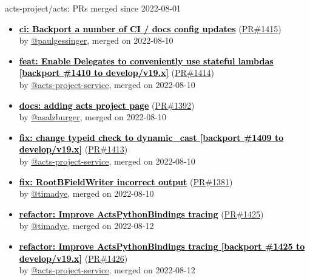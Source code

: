 \documentclass{beamer}
\begin{document}
\begin{frame}[allowframebreaks]{ acts-project/acts: PRs merged since 2022-08-01 }
\begin{itemize}
    \item
    \textbf{\href{https://github.com/acts-project/acts/pull/1415}{\textcolor{black}{ci: Backport a number of CI / docs config updates}}}
    (\href{https://github.com/acts-project/acts/pull/1415}{PR\#1415}) \\
    by \href{https://github.com/paulgessinger}{ @paulgessinger}, merged on 2022-08-10

    \item
    \textbf{\href{https://github.com/acts-project/acts/pull/1414}{\textcolor{black}{feat: Enable Delegates to conveniently use stateful lambdas [backport \#1410 to develop/v19.x]}}}
    (\href{https://github.com/acts-project/acts/pull/1414}{PR\#1414}) \\
    by \href{https://github.com/acts-project-service}{ @acts-project-service}, merged on 2022-08-10

    \item
    \textbf{\href{https://github.com/acts-project/acts/pull/1392}{\textcolor{black}{docs: adding acts project page}}}
    (\href{https://github.com/acts-project/acts/pull/1392}{PR\#1392}) \\
    by \href{https://github.com/asalzburger}{ @asalzburger}, merged on 2022-08-10

    \item
    \textbf{\href{https://github.com/acts-project/acts/pull/1413}{\textcolor{black}{fix: change typeid check to dynamic\_cast [backport \#1409 to develop/v19.x]}}}
    (\href{https://github.com/acts-project/acts/pull/1413}{PR\#1413}) \\
    by \href{https://github.com/acts-project-service}{ @acts-project-service}, merged on 2022-08-10

    \item
    \textbf{\href{https://github.com/acts-project/acts/pull/1381}{\textcolor{black}{fix: RootBFieldWriter incorrect output}}}
    (\href{https://github.com/acts-project/acts/pull/1381}{PR\#1381}) \\
    by \href{https://github.com/timadye}{ @timadye}, merged on 2022-08-10

    \item
    \textbf{\href{https://github.com/acts-project/acts/pull/1425}{\textcolor{black}{refactor: Improve ActsPythonBindings tracing}}}
    (\href{https://github.com/acts-project/acts/pull/1425}{PR\#1425}) \\
    by \href{https://github.com/timadye}{ @timadye}, merged on 2022-08-12

    \item
    \textbf{\href{https://github.com/acts-project/acts/pull/1426}{\textcolor{black}{refactor: Improve ActsPythonBindings tracing [backport \#1425 to develop/v19.x]}}}
    (\href{https://github.com/acts-project/acts/pull/1426}{PR\#1426}) \\
    by \href{https://github.com/acts-project-service}{ @acts-project-service}, merged on 2022-08-12


\end{itemize}
\end{frame}
\end{document}
